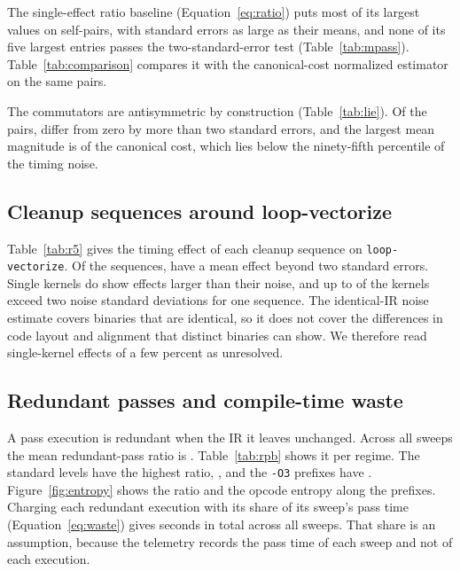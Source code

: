 

The single-effect ratio baseline (Equation~\ref{eq:ratio}) puts most of its largest values on self-pairs, with standard
errors as large as their means, and none of its five largest entries passes the two-standard-error test (Table~\ref{tab:mpass}).
Table~\ref{tab:comparison} compares it with the canonical-cost normalized estimator on the same pairs.





The commutators are antisymmetric by construction (Table~\ref{tab:lie}). Of the \LieCells{} pairs, \LieSignificantCells{} differ
from zero by more than two standard errors, and the largest mean magnitude is \LieMaxAbs{} of the canonical cost, which lies
below the ninety-fifth percentile of the timing noise.



\subsection{Cleanup sequences around loop-vectorize}

Table~\ref{tab:r5} gives the timing effect of each cleanup sequence on \texttt{loop-vectorize}. Of the \RFiveSequencesJudged{}
sequences, \RFiveSequencesSignificant{} have a mean effect beyond two standard errors. Single kernels do show effects larger than
their noise, and up to \RFiveKernelsBeyondNoiseMax{} of the \NumKernels{} kernels exceed two noise standard deviations for one
sequence. The identical-IR noise estimate covers binaries that are identical, so it does not cover the differences in code layout
and alignment that distinct binaries can show. We therefore read single-kernel effects of a few percent as unresolved.



\subsection{Redundant passes and compile-time waste}
\label{sec:results-rpb}

A pass execution is redundant when the IR it leaves unchanged. Across all sweeps the mean redundant-pass ratio is
\RpbOverallMean{}. Table~\ref{tab:rpb} shows it per regime. The standard levels have the highest ratio, \RpbOneMean{}, and the
\texttt{-O3} prefixes have \RpbFourMean{}. Figure~\ref{fig:entropy} shows the ratio and the opcode entropy along the prefixes.
Charging each redundant execution with its share of its sweep's pass time (Equation~\ref{eq:waste}) gives
\WasteTotalSeconds{} seconds in total across all sweeps. That share is an assumption, because the telemetry records the pass time
of each sweep and not of each execution.


